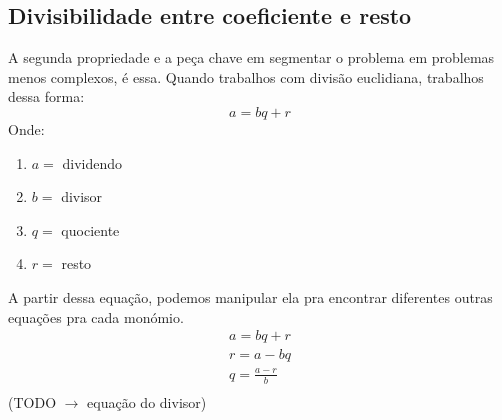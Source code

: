 \documentclass{article}
\begin{document}
    \subsection{Divisibilidade entre coeficiente e resto}
    A segunda propriedade e a peça chave em segmentar o problema em problemas menos complexos, é essa. Quando trabalhos com divisão euclidiana, trabalhos dessa forma:
    \begin{equation}
        a = bq + r
    \end{equation}
    Onde:
    \begin{enumerate}
        \item $a =$ dividendo
        \item $b =$ divisor
        \item $q =$ quociente
        \item $r =$ resto
    \end{enumerate}
    A partir dessa equação, podemos manipular ela pra encontrar diferentes outras equações pra cada monómio.
    \begin{equation}
        \begin{split}
            a = bq+r\\
            r = a-bq\\
            q = \frac{a-r}{b} \\
        \end{split}
    \end{equation}
    (TODO $\to$ equação do divisor)
\end{document}
